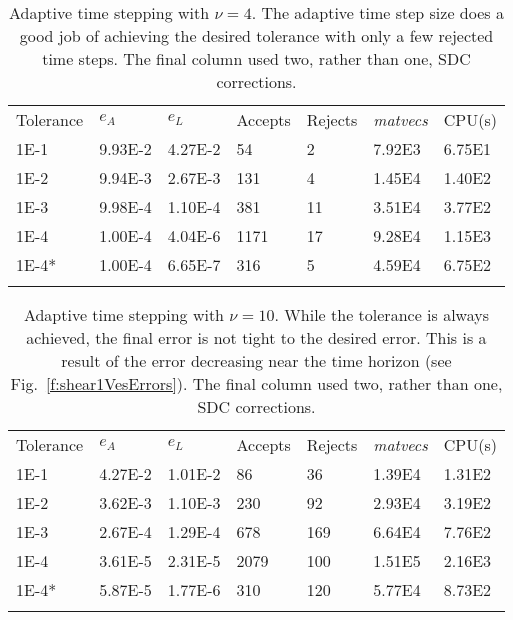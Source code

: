 \documentclass[3p,times,procedia]{elsarticle}
\begin{document}
\begin{table}[h]
\caption{\label{t:shear_nu4_sdc1}Adaptive time stepping with $\nu = 4$.
The adaptive time step size does a good job of achieving the desired
tolerance with only a few rejected time steps.  The final column used
two, rather than one, SDC corrections.}
\begin{tabular*}{\hsize}{@{\extracolsep{\fill}}lllllll@{}}
\toprule
Tolerance & $e_{A}$ & $e_{L}$ & Accepts & Rejects & {\em matvecs} &
CPU(s) \\
\colrule
1E-1  & 9.93E-2 & 4.27E-2 & 54   & 2  & 7.92E3 & 6.75E1 \\
1E-2  & 9.94E-3 & 2.67E-3 & 131  & 4  & 1.45E4 & 1.40E2 \\
1E-3  & 9.98E-4 & 1.10E-4 & 381  & 11 & 3.51E4 & 3.77E2 \\
1E-4  & 1.00E-4 & 4.04E-6 & 1171 & 17 & 9.28E4 & 1.15E3 \\
1E-4* & 1.00E-4 & 6.65E-7 & 316  & 5  & 4.59E4 & 6.75E2 \\
\botrule
\end{tabular*}
\end{table}

\begin{table}[h]
\caption{\label{t:shear_nu10_sdc1}Adaptive time stepping with $\nu =
10$.  While the tolerance is always achieved, the final error is not
tight to the desired error.  This is a result of the error decreasing
near the time horizon (see Fig.~\ref{f:shear1VesErrors}).  The final
column used two, rather than one, SDC corrections.}
\begin{tabular*}{\hsize}{@{\extracolsep{\fill}}lllllll@{}}
\toprule
Tolerance & $e_{A}$ & $e_{L}$ & Accepts & Rejects & {\em matvecs} &
CPU(s) \\
\colrule
1E-1  & 4.27E-2 & 1.01E-2 & 86   & 36  & 1.39E4 & 1.31E2 \\
1E-2  & 3.62E-3 & 1.10E-3 & 230  & 92  & 2.93E4 & 3.19E2 \\
1E-3  & 2.67E-4 & 1.29E-4 & 678  & 169 & 6.64E4 & 7.76E2 \\
1E-4  & 3.61E-5 & 2.31E-5 & 2079 & 100 & 1.51E5 & 2.16E3 \\
1E-4* & 5.87E-5 & 1.77E-6 & 310  & 120 & 5.77E4 & 8.73E2 \\
\botrule
\end{tabular*}
\end{table}
\end{document}
